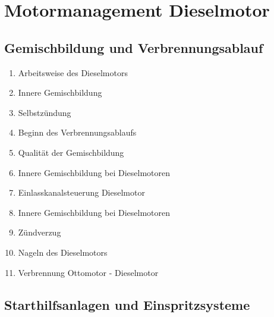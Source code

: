 \section{Motormanagement
Dieselmotor}\label{motormanagement-dieselmotor}

\subsection{Gemischbildung und
Verbrennungsablauf}\label{gemischbildung-und-verbrennungsablauf}

\begin{enumerate}
\item
  Arbeitsweise des Dieselmotors\\
\item
  Innere Gemischbildung\\
\item
  Selbstzündung\\
\item
  Beginn des Verbrennungsablaufs\\
\item
  Qualität der Gemischbildung\\
\item
  Innere Gemischbildung bei Dieselmotoren\\
\item
  Einlasskanalsteuerung Dieselmotor\\
\item
  Innere Gemischbildung bei Dieselmotoren\\
\item
  Zündverzug\\
\item
  Nageln des Dieselmotors\\
\item
  Verbrennung Ottomotor - Dieselmotor
\end{enumerate}

\subsection{Starthilfsanlagen und
Einspritzsysteme}\label{starthilfsanlagen-und-einspritzsysteme}

